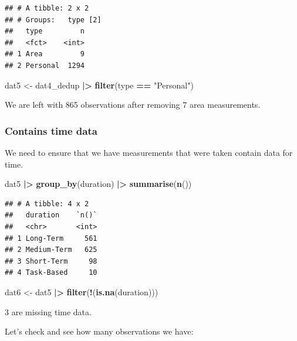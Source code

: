 \documentclass[
]{article}
\newenvironment{Shaded}{\begin{snugshade}}{\end{snugshade}}
\newcommand{\FunctionTok}[1]{\textcolor[rgb]{0.13,0.29,0.53}{\textbf{#1}}}
\newcommand{\NormalTok}[1]{#1}
\newcommand{\OtherTok}[1]{\textcolor[rgb]{0.56,0.35,0.01}{#1}}
\newcommand{\SpecialCharTok}[1]{\textcolor[rgb]{0.81,0.36,0.00}{\textbf{#1}}}
\newcommand{\StringTok}[1]{\textcolor[rgb]{0.31,0.60,0.02}{#1}}
\begin{document}
\begin{verbatim}
## # A tibble: 2 x 2
## # Groups:   type [2]
##   type         n
##   <fct>    <int>
## 1 Area         9
## 2 Personal  1294
\end{verbatim}

\begin{Shaded}
\begin{Highlighting}[]
\NormalTok{dat5 }\OtherTok{\textless{}{-}}\NormalTok{ dat4\_dedup }\SpecialCharTok{|\textgreater{}} 
  \FunctionTok{filter}\NormalTok{(type }\SpecialCharTok{==} \StringTok{"Personal"}\NormalTok{)}
\end{Highlighting}
\end{Shaded}

We are left with 865 observations after removing 7 area measurements.

\subsubsection{Contains time data}\label{contains-time-data}

We need to ensure that we have measurements that were taken contain data
for time.

\begin{Shaded}
\begin{Highlighting}[]
\NormalTok{dat5 }\SpecialCharTok{|\textgreater{}} 
  \FunctionTok{group\_by}\NormalTok{(duration) }\SpecialCharTok{|\textgreater{}} 
  \FunctionTok{summarise}\NormalTok{(}\FunctionTok{n}\NormalTok{()) }
\end{Highlighting}
\end{Shaded}

\begin{verbatim}
## # A tibble: 4 x 2
##   duration    `n()`
##   <chr>       <int>
## 1 Long-Term     561
## 2 Medium-Term   625
## 3 Short-Term     98
## 4 Task-Based     10
\end{verbatim}

\begin{Shaded}
\begin{Highlighting}[]
\NormalTok{dat6 }\OtherTok{\textless{}{-}}\NormalTok{ dat5 }\SpecialCharTok{|\textgreater{}} 
  \FunctionTok{filter}\NormalTok{(}\SpecialCharTok{!}\NormalTok{(}\FunctionTok{is.na}\NormalTok{(duration)))}
\end{Highlighting}
\end{Shaded}

3 are missing time data.

Let's check and see how many observations we have:
\end{document}
